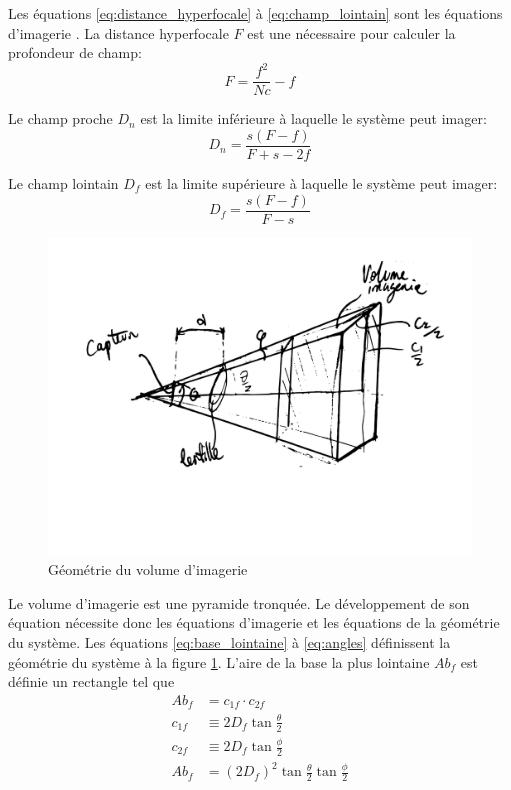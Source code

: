 Les équations \ref{eq:distance_hyperfocale} à \ref{eq:champ_lointain} sont les équations d'imagerie \cite{Photographic_optics}. La distance hyperfocale $F$ est une nécessaire pour calculer la profondeur de champ:
\begin{equation}
    F = \frac{f^2}{Nc} - f
    \label{eq:distance_hyperfocale}
\end{equation}

Le champ proche $D_n$ est la limite inférieure à laquelle le système peut imager:
\begin{equation}
    D_n = \frac{s(F-f)}{F+s-2f}
    \label{eq:champ_proche}
\end{equation}

Le champ lointain $D_f$ est la limite supérieure à laquelle le système peut imager:
\begin{equation}
    D_f = \frac{s(F-f)}{F-s}
    \label{eq:champ_lointain}
\end{equation}

\begin{figure}[!htb]
    \centering
    \includegraphics[width=0.5\linewidth]{fig/camera_custom_geometrie_vect.png}    \caption{Géométrie du volume d'imagerie}
    \label{fig:volume_imagerie}
\end{figure}


Le volume d'imagerie est une pyramide tronquée. Le développement de son équation nécessite donc les équations d'imagerie et les équations de la géométrie du système. Les équations \ref{eq:base_lointaine} à \ref{eq:angles} définissent la géométrie du système à la figure \ref{fig:volume_imagerie}. L'aire de la base la plus lointaine $Ab_f$ est définie un rectangle tel que
\begin{align}
    Ab_f &= c_{1f} \cdot c_{2f}\\
    c_{1f} &\equiv 2D_f \tan{\frac{\theta}{2}}\\
    c_{2f} &\equiv 2D_f \tan{\frac{\phi}{2}}\\
    Ab_f &= (2 D_f)^2 \tan{\frac{\theta}{2}} \tan{\frac{\phi}{2}}
    \label{eq:base_lointaine}
\end{align}

